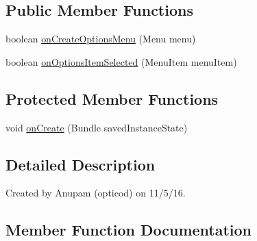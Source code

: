 \subsection*{Public Member Functions}
\begin{DoxyCompactItemize}
\item 
boolean \hyperlink{classorg_1_1buildmlearn_1_1videocollection_1_1activities_1_1DetailActivity_a2d42da69ac809713db3b5fec1b764df2}{on\+Create\+Options\+Menu} (Menu menu)
\item 
boolean \hyperlink{classorg_1_1buildmlearn_1_1videocollection_1_1activities_1_1DetailActivity_a069ae26a3306ccf25bf687505a9bff13}{on\+Options\+Item\+Selected} (Menu\+Item menu\+Item)
\end{DoxyCompactItemize}
\subsection*{Protected Member Functions}
\begin{DoxyCompactItemize}
\item 
void \hyperlink{classorg_1_1buildmlearn_1_1videocollection_1_1activities_1_1DetailActivity_ae33bf9902352cfead0b1037b12776379}{on\+Create} (Bundle saved\+Instance\+State)
\end{DoxyCompactItemize}


\subsection{Detailed Description}
Created by Anupam (opticod) on 11/5/16. 

\subsection{Member Function Documentation}
